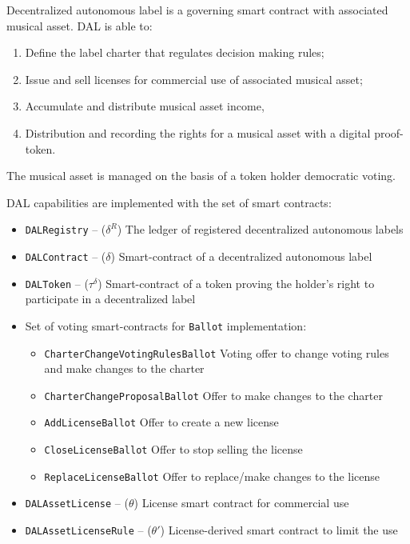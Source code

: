\documentclass[12pt]{report}
\newcommand{\hlc}[1]{\colorbox{yellow!25}{#1}}
\def\code#1{\colorbox{light-gray}{\texttt{#1}}}
\begin{document}
\begin{multicols}{2}
Decentralized autonomous label is a governing smart contract with associated musical asset. DAL is able to:
\begin{enumerate}
	\item Define the label charter that regulates decision making rules;
	\item Issue and sell licenses for commercial use of associated musical asset;
	\item Accumulate and distribute musical asset income,
	\item Distribution and recording the rights for a musical asset with a digital proof-token.
\end{enumerate}

The musical asset is managed on the basis of a token holder democratic voting.

DAL capabilities are implemented with the set of smart contracts:
\begin{itemize}
	\item\code{DALRegistry} – ($\delta^R$)\hfill\null\linebreak
	The ledger of registered decentralized autonomous labels
	\item\code{DALContract} – ($\delta$)\hfill\null\linebreak
	Smart-contract of a decentralized autonomous label
	\item\code{DALToken} – ($\tau^\delta$)\hfill\null\linebreak
	Smart-contract of a token proving the holder's right to participate in a decentralized label
	\item \hlc{Set of voting smart-contracts} for \code{Ballot} implementation:
	\begin{itemize}
		\item\code{CharterChangeVotingRulesBallot}
		Voting offer to change voting rules and make changes to the charter
		\item\code{CharterChangeProposalBallot}\hfill\null\linebreak
		Offer to make changes to the charter
		\item\code{AddLicenseBallot}\hfill\null\linebreak
		Offer to create a new license
		\item\code{CloseLicenseBallot}\hfill\null\linebreak
		Offer to stop selling the license
		\item\code{ReplaceLicenseBallot}\hfill\null\linebreak
		Offer to replace/make changes to the license
	\end{itemize}
\item\code{DALAssetLicense} – ($\theta$)\hfill\null\linebreak
License smart contract for commercial use
\item\code{DALAssetLicenseRule} – ($\theta'$)\hfill\null\linebreak
License-derived smart contract to limit the use 
\end{itemize}
\end{multicols}
\vfill\null\pagebreak
\end{document}
